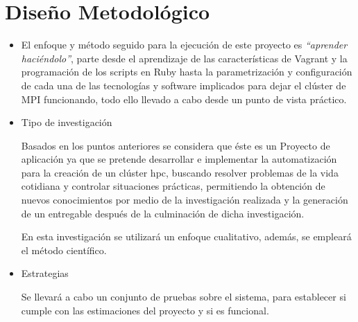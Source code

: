 \documentclass[letterpaper, 12pt, oneside]{article}
\begin{document}
    \section{Diseño Metodológico}
     \begin{itemize}
        \item 

  El enfoque y método seguido para la ejecución de este proyecto es \textit{“aprender haciéndolo”}, parte desde el aprendizaje de las características de Vagrant y la programación de los scripts en Ruby hasta la parametrización y configuración de cada una de las tecnologías y software implicados para dejar el clúster de MPI funcionando, todo ello llevado a cabo desde un punto de vista práctico.

  
        \item Tipo de investigación
        
        Basados en los puntos anteriores se considera que éste es un Proyecto de aplicación ya que se pretende desarrollar e implementar la automatización para la creación de un clúster hpc, buscando resolver problemas de la vida cotidiana y controlar situaciones prácticas, permitiendo la obtención de nuevos conocimientos por medio de la investigación realizada y la generación de un entregable después de la culminación de dicha investigación. 
    
        En esta investigación se utilizará un enfoque cualitativo, además, se empleará el método científico.
        
        \item Estrategias
        
        Se llevará a cabo un conjunto de pruebas sobre el sistema, para establecer si cumple con las estimaciones del proyecto y si es funcional.
     \end{itemize}
    \newpage
\end{document}

